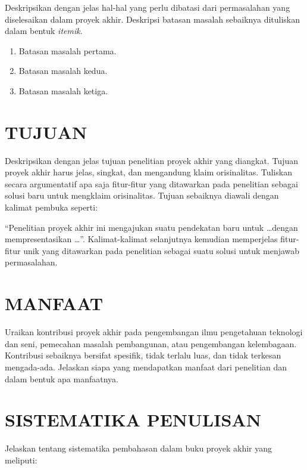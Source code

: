 Deskripsikan dengan jelas hal-hal yang perlu dibatasi dari permasalahan yang diselesaikan
dalam proyek akhir. Deskripsi batasan masalah sebaiknya dituliskan dalam bentuk
\textit{itemik}.

\begin{enumerate}[label=\arabic*., leftmargin=*]
  \item Batasan masalah pertama.
  \item Batasan masalah kedua.
  \item Batasan masalah ketiga.
\end{enumerate}
\fi

\section{TUJUAN}

Deskripsikan dengan jelas tujuan penelitian proyek akhir yang diangkat. Tujuan proyek
akhir harus jelas, singkat, dan mengandung klaim orisinalitas. Tuliskan secara
argumentatif apa saja fitur-fitur yang ditawarkan pada penelitian sebagai solusi baru
untuk mengklaim orisinalitas. Tujuan sebaiknya diawali dengan kalimat pembuka seperti:

``Penelitian proyek akhir ini mengajukan suatu pendekatan baru untuk \ldots dengan
mempresentasikan \ldots''. Kalimat-kalimat selanjutnya kemudian memperjelas
fitur-fitur unik yang ditawarkan pada penelitian sebagai suatu solusi untuk menjawab
permasalahan.

\section{MANFAAT}

Uraikan kontribusi proyek akhir pada pengembangan ilmu pengetahuan teknologi dan seni,
pemecahan masalah pembangunan, atau pengembangan kelembagaan. Kontribusi sebaiknya
bersifat spesifik, tidak terlalu luas, dan tidak terkesan mengada-ada. Jelaskan siapa
yang mendapatkan manfaat dari penelitian dan dalam bentuk apa manfaatnya.

\section{SISTEMATIKA PENULISAN}

Jelaskan tentang sistematika pembahasan dalam buku proyek akhir yang meliputi:


